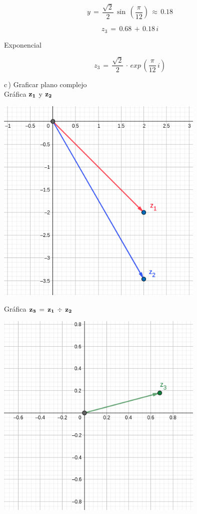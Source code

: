 \documentclass[a4paper,11pt,openany]{book}
\begin{document}
$$y\,=\,\dfrac{\sqrt{2}}{2}\,\sin\,\left(\dfrac{\pi}{12}\right)\,\approx\,0.18$$

$$z_{3}\,=\,0.68\,+\,0.18\,i$$

\textcolor{ao(english)}{} Exponencial

$$z_{3}\,=\,\dfrac{\sqrt{2}}{2}\,\cdot\,exp\,\left(\dfrac{\pi}{12}\,i\right)$$

\textcolor{ao(english)}{c\,)} Graficar plano complejo\\

\textcolor{ao(english)}{} Gráfica $\bf{z_{1}}$ y $\bf{z_{2}}$

\begin{center}
    \includegraphics[width=10cm]{Gra-Ej-6-1.png}
\end{center}

\textcolor{ao(english)}{} Gráfica $\bf{z_{3}\,=\,z_{1}\,\div\,z_{2}}$

\begin{center}
    \includegraphics[width=10cm]{Gra-Ej-6-2.png}
\end{center}
\end{document}
